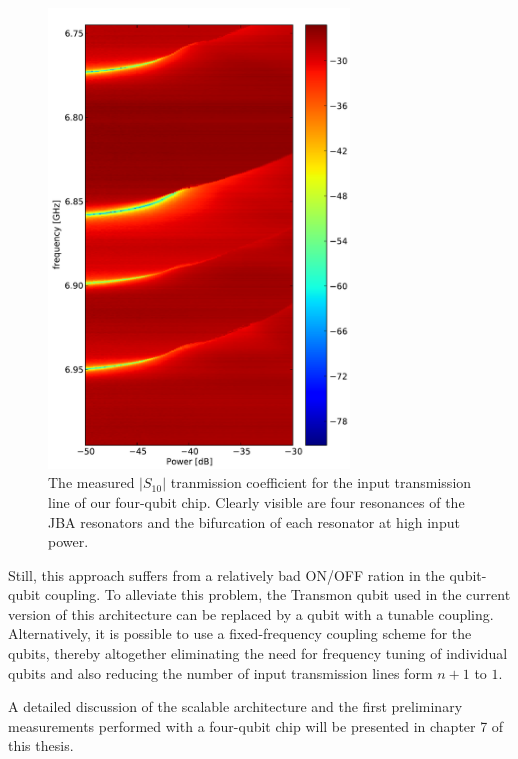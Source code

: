 \begin{figure}
	\centering
	\includegraphics[width=8cm]{./material/figures/scalable-architecture/jba_multiplexed_spectroscopy}
	\caption[Measured $|S_{10}|$ transmission coefficient for the input transmission line of our four-qubit chip]{The measured $|S_{10}|$ tranmission coefficient for the input transmission line of our four-qubit chip. Clearly visible are four resonances of the JBA resonators and the bifurcation of each resonator at high input power.}
	\label{fig:jba_multiplexed_spectroscopy}
\end{figure}

Still, this approach suffers from a relatively bad ON/OFF ration in the qubit-qubit coupling. To alleviate this problem, the Transmon qubit used in the current version of this architecture can be replaced by a qubit with a tunable coupling\citep{srinivasan_tunable_2011}. Alternatively, it is possible to use a fixed-frequency coupling scheme for the qubits, thereby altogether eliminating the need for frequency tuning of individual qubits and also reducing the number of input transmission lines form $n+1$ to $1$.

\smallskip

A detailed discussion of the scalable architecture and the first preliminary measurements performed with a four-qubit chip will be presented in chapter 7 of this thesis.